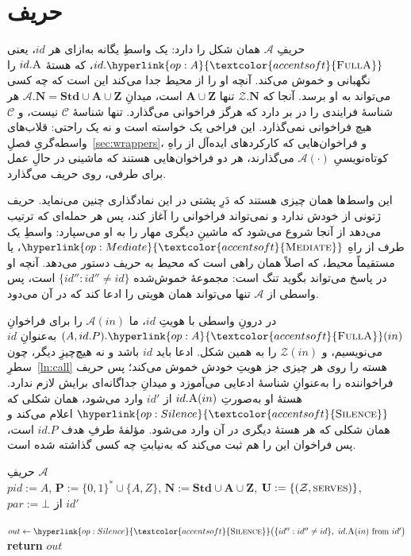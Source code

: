 \documentclass[10pt,oneside,openany]{book}
\newcommand{\Ps}{\mathbf{P}}
\newcommand{\PID}{\mathit{pid}}
\newcommand{\admits}{\mathbf{N}}
\newcommand{\Apid}{\mathbf{A}}
\newcommand{\Zpid}{\mathbf{Z}}
\newcommand{\Stdpid}{\mathbf{Std}}
\newcommand{\pars}{\mathit{par}}
\newcommand{\uses}{\mathbf{U}}
\newcommand{\serves}{\op{serves}}
\newcommand{\Corr}{\mathcal{C}}
\newcommand{\Zenv}{\mathcal{Z}}
\newcommand{\Adv}{\mathcal{A}}
\newcommand{\op}[1]{\textnormal{\textsc{#1}}}
\newcommand{\opl}[1]{\hyperlink{op:#1}{\textcolor{accentsoft}{\op{#1}}}}
\newcommand{\fopdef}[1]{\hypertarget{op:#1}{\op{Full}\op{#1}}}
\newcommand{\fopl}[1]{\hyperlink{op:#1}{\textcolor{accentsoft}{\op{Full}\op{#1}}}}
\newcommand{\id}{id}
\newcommand{\none}{\bot}
\newcommand{\bits}{\{0,1\}^*}
\newcommand{\params}[1]{{\footnotesize\normalfont\color{black!72} #1}}
\newcommand{\opsig}[1]{\textcolor{accent}{\underline{\smash{#1}}}}
\theoremstyle{accentdef}
\theoremstyle{accentplain}
\begin{document}
\section{حریف}\label{sec:adv}

حریفِ $\Adv$ همان شکل را دارد: یک واسطِ یگانه به‌ازای هر $\id$، یعنی
$\id.\fopl{A}$، که هستهٔ $\id.\op{A}$ را نگهبانی و خموش می‌کند. آنچه او را
از محیط جدا می‌کند این است که چه کسی می‌تواند به او برسد. آنجا که
$\Zenv.\admits$ تنها $\Apid \cup \Zpid$ است، میدانِ $\Adv.\admits =
\Stdpid \cup \Apid \cup \Zpid$ هر شناسهٔ فرایندی را در بر دارد که هرگز
فراخوانی می‌گذارد. تنها شناسهٔ $\Corr$ نیست، و $\Corr$ هیچ فراخوانی
نمی‌گذارد. این فراخی یک خواسته است و نه یک راحتی: قلاب‌های واسطه‌گریِ
فصلِ~\ref{sec:wrappers}، و فراخوان‌هایی که کارکردهای ایده‌آل از راهِ
کوتاه‌نویسیِ $\Adv(\cdot)$ می‌گذارند، هر دو فراخوان‌هایی هستند که ماشینی
در حالِ عمل برای طرفی، روی حریف می‌گذارد.

این واسط‌ها همان چیزی هستند که دَرِ پشتی در این نمادگذاری چنین می‌نماید.
حریف ژتونی از خودش ندارد و نمی‌تواند فراخوانی را آغاز کند، پس هر حمله‌ای
که ترتیب می‌دهد از آنجا شروع می‌شود که ماشینِ دیگری مهار را به او
می‌سپارد: واسطِ یک طرف از راهِ $\opl{Mediate}$، یا مستقیماً محیط، که
اصلاً همان راهی است که محیط به حریف دستور می‌دهد. آنچه او در پاسخ
می‌تواند بگوید تنگ است: مجموعهٔ خموش‌شده $\{\id'' : \id'' \ne \id\}$ است،
پس واسطی از $\Adv$ تنها می‌تواند همان هویتی را ادعا کند که در آن می‌دود.

در درونِ واسطی با هویتِ $\id$، ما $\Adv(in)$ را برای فراخوانِ
$(A,\id.P).\fopl{A}(in)$ به‌عنوانِ $\id$ می‌نویسیم، و $\Zenv(in)$ را به
همین شکل. ادعا باید $\id$ باشد و نه هیچ‌چیزِ دیگر، چون
سطرِ~\ref{ln:call} هسته را روی هر چیزی جز هویتِ خودش خموش می‌کند؛ پس حریف
فراخواننده را به‌عنوانِ شناسهٔ ادعایی می‌آموزد و میدانِ جداگانه‌ای برایش
لازم ندارد. هستهٔ او به‌صورتِ $\id.\op{A}(in)$ از $\id'$ وارد می‌شود، همان
شکلی که $\opl{Silence}$ اعلام می‌کند و همان شکلی که هر هستهٔ دیگری در آن
وارد می‌شود. مؤلفهٔ طرفِ هدف $\id.P$ است، پس فراخوان این را هم ثبت می‌کند
که به‌نیابتِ چه کسی گذاشته شده است.

\begin{interface}{حریفِ $\Adv$ \\
\params{$\PID := A$, \quad $\Ps := \bits \cup \{A,Z\}$, \quad
$\admits := \Stdpid \cup \Apid \cup \Zpid$, \quad $\uses := \{(\Zenv,\serves)\}$, \quad
$\pars := \none$}}
\opsig{$\id.\fopdef{A}(in)$} \quad از $\id'$
\begin{algorithmic}[1]
  \Req{$\opl{Guard}_{\Adv}\bigl(\id,\id'\bigr)$}
  \State $out \gets \opl{Silence}\bigl(\{\id'' : \id'' \ne \id \} ,\ \id.\op{A}(in) \text{ from } \id' \bigr)$
    \label{ln:advsil}
  \State \textbf{return} $out$
\end{algorithmic}
\end{interface}
\end{document}
